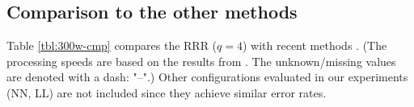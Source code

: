 \documentclass{article}
\begin{document}
	\subsection{Comparison to the other methods}
		Table \ref{tbl:300w-cmp} compares the RRR ($q=4$) with recent methods
		\cite{zhuetal,DRMF,microsoft_face_align,RCPR,SDM,smithetal,zhaoetal,GN-DPM,CFAN,ERT,lbf,TDCNN,cGPRT,CFSS,DCR}.
		(The processing speeds are based on the results from \cite{lbf-tip}.
		The unknown/missing values are denoted with a dash: "--".)
		Other configurations evaluated in our experiments (NN, LL) are not included since they achieve similar error rates.
\end{document}
